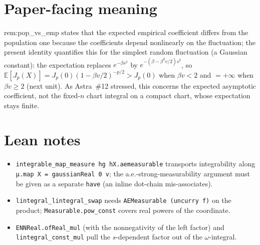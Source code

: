 \documentclass[11pt]{article}
\begin{document}
\section{Paper-facing meaning}
rem:pop\_vs\_emp states that the expected empirical coefficient differs from the population one
because the coefficients depend nonlinearly on the fluctuation; the present identity quantifies this
for the simplest random fluctuation (a Gaussian constant): the expectation replaces $e^{-\beta s^2}$ by
$e^{-(\beta-\beta^2v/2)s^2}$, so $\mathbb E[J_p(X)]=J_p(0)(1-\beta v/2)^{-p/2}>J_p(0)$ when
$\beta v<2$ and $=+\infty$ when $\beta v\ge2$ (next unit). As Astra~\#12 stressed, this concerns
the expected asymptotic coefficient, not the fixed-$n$ chart integral on a compact chart, whose
expectation stays finite.

\section{Lean notes}
\begin{itemize}
\item \texttt{integrable\_map\_measure hg hX.aemeasurable} transports integrability along
\texttt{μ.map X = gaussianReal 0 v}; the a.e.-strong-measurability argument must be given as a
separate \texttt{have} (an inline dot-chain mis-associates).
\item \texttt{lintegral\_lintegral\_swap} needs \texttt{AEMeasurable (uncurry f)} on the product;
\texttt{Measurable.pow\_const} covers real powers of the coordinate.
\item \texttt{ENNReal.ofReal\_mul} (with the nonnegativity of the left factor) and
\texttt{lintegral\_const\_mul} pull the $s$-dependent factor out of the $\omega$-integral.
\end{itemize}
\end{document}
